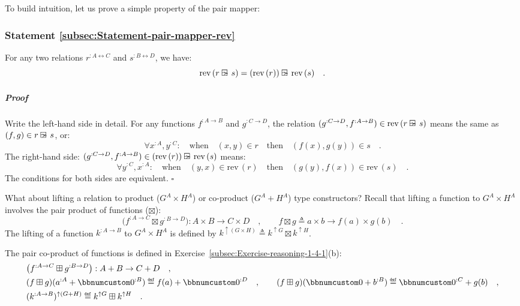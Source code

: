To build intuition, let us prove a simple property of the pair mapper:

\subsubsection{Statement \label{subsec:Statement-pair-mapper-rev}\ref{subsec:Statement-pair-mapper-rev}}

For any two relations $r^{:A\leftrightarrow C}$ and $s^{:B\leftrightarrow D}$,
we have:
\[
\text{rev}\,(r\varogreaterthan s)=(\text{rev}\,(r))\varogreaterthan\text{rev}\,(s)\quad.
\]


\subparagraph{Proof}

Write the left-hand side in detail. For any functions $f^{:A\rightarrow B}$
and $g^{:C\rightarrow D}$, the relation $(g^{:C\rightarrow D},f^{:A\rightarrow B})\in\text{rev}\,(r\varogreaterthan s)$
means the same as $(f,g)\in r\varogreaterthan s$, or:
\[
\forall x^{:A},y^{:C}:\quad\text{when}\quad(x,y)\in r\quad\text{then}\quad(f(x),g(y))\in s\quad.
\]
The right-hand side: $(g^{:C\rightarrow D},f^{:A\rightarrow B})\in(\text{rev}\,(r))\varogreaterthan\text{rev}\,(s)$
means:
\[
\forall y^{:C},x^{:A}:\quad\text{when}\quad(y,x)\in\text{rev}\,(r)\quad\text{then}\quad(g(y),f(x))\in\text{rev}\,(s)\quad.
\]
The conditions for both sides are equivalent. $\square$ 

What about lifting a relation to product ($G^{A}\times H^{A}$) or
co-product ($G^{A}+H^{A}$) type constructors? Recall that lifting
a function to $G^{A}\times H^{A}$ involves the pair product of functions
($\boxtimes$):
\[
\big(f^{:A\rightarrow C}\boxtimes g^{:B\rightarrow D}\big):A\times B\rightarrow C\times D\quad,\quad\quad f\boxtimes g\triangleq a\times b\rightarrow f(a)\times g(b)\quad.
\]
The lifting of a function $k^{:A\rightarrow B}$ to $G^{A}\times H^{A}$
is defined by $k^{\uparrow(G\times H)}\triangleq k^{\uparrow G}\boxtimes k^{\uparrow H}$. 

The pair co-product of functions
is defined in Exercise~\ref{subsec:Exercise-reasoning-1-4-1}(b):
\begin{align*}
 & \big(f^{:A\rightarrow C}\boxplus g^{:B\rightarrow D}\big):A+B\rightarrow C+D\quad,\\
 & (f\boxplus g)(a^{:A}+\bbnum 0^{:B})\triangleq f(a)+\bbnum 0^{:D}\quad,\quad\quad(f\boxplus g)(\bbnum 0+b^{:B})\triangleq\bbnum 0^{:C}+g(b)\quad,\\
 & (k^{:A\rightarrow B})^{\uparrow(G+H)}\triangleq k^{\uparrow G}\boxplus k^{\uparrow H}\quad.
\end{align*}

